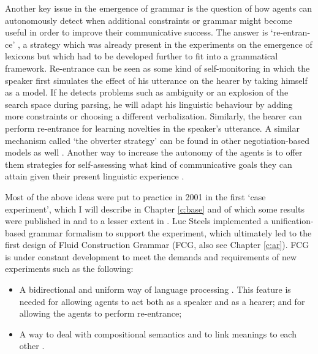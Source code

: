 Another key issue in the emergence of grammar is the question of how agents can autonomously detect when additional constraints or grammar might become useful in order to improve their communicative success. The answer is `re-entran-ce' \citep{steels03language}, a strategy which was already present in the experiments on the emergence of lexicons but which had to be developed further to fit into a grammatical framework. Re-entrance can be seen as some kind of self-monitoring in which the speaker first simulates the effect of his utterance on the hearer by taking himself as a model. If he detects problems such as ambiguity or an explosion of the search space during parsing, he will adapt his linguistic behaviour by adding more constraints or choosing a different verbalization. Similarly, the hearer can perform re-entrance for learning novelties in the speaker's utterance. A similar mechanism called `the obverter strategy' can be found in other negotiation-based models as well \citep{smith03intelligent}. Another way to increase the autonomy of the agents is to offer them strategies for self-assessing what kind of communicative goals they can attain given their present linguistic experience \citep[called the `autotelic principle',][]{steels04architecture, steels04autotelic, steels07scaffolding}.

Most of the above ideas were put to practice in 2001 in the first `case experiment', which I will describe in Chapter \ref{c:base} and of which some results were published in \citet{steels04constructivist} and to a lesser extent in \citet{steels03language, steels07recruitment}. Luc Steels implemented a unification-based grammar formalism to support the experiment, which ultimately led to the first design of Fluid Construction Grammar (FCG, also see Chapter \ref{c:ar}). FCG is under constant development to meet the demands and requirements of new experiments such as the following:

\begin{itemize}
\item A bidirectional and uniform way of language processing \citep{steels06unify}. This feature is needed for allowing agents to act both as a speaker and as a hearer; and for allowing the agents to perform re-entrance;
\item A way to deal with compositional semantics and to link meanings to each other \citep{steels05linking}.
\end{itemize}

